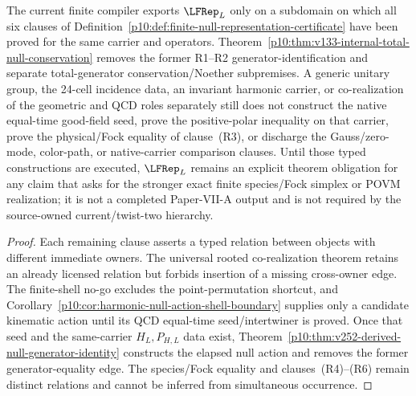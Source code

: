 \documentclass[12pt,a4paper]{article}
\begin{document}
\begin{theorem}
\label{p10:thm:finite-null-representation-status}
The current finite compiler exports \(\LFRep_L\) only on a subdomain on which
all six clauses of
Definition~\ref{p10:def:finite-null-representation-certificate} have been
proved for the same carrier and operators.  Theorem~\ref{p10:thm:v133-internal-total-null-conservation}
removes the former R1--R2 generator-identification and separate
total-generator conservation/Noether subpremises.  A generic unitary group,
the 24-cell incidence data, an invariant harmonic carrier, or co-realization
of the geometric and QCD roles separately still does not construct the native
equal-time good-field seed, prove the positive-polar inequality on that
carrier, prove the physical/Fock equality of clause~\textnormal{(R3)}, or
discharge the Gauss/zero-mode, color-path, or native-carrier comparison
clauses.  Until those typed constructions are executed,
\(\LFRep_L\) remains an explicit theorem obligation for any claim that asks
for the stronger exact finite species/Fock simplex or POVM realization; it is
not a completed Paper-VII-A output and is not required by the source-owned
current/twist-two hierarchy.
\end{theorem}

\begin{proof}
Each remaining clause asserts a typed relation between objects with different
immediate owners.  The universal rooted co-realization theorem retains an
already licensed relation but forbids insertion of a missing cross-owner edge.
The finite-shell no-go excludes the point-permutation shortcut, and
Corollary~\ref{p10:cor:harmonic-null-action-shell-boundary} supplies only a
candidate kinematic action until its QCD equal-time seed/intertwiner is proved.
Once that seed and the same-carrier \(H_L,P_{H,L}\) data exist,
Theorem~\ref{p10:thm:v252-derived-null-generator-identity} constructs the
elapsed null action and removes the former generator-equality edge.  The
species/Fock equality and clauses~\textnormal{(R4)--(R6)} remain distinct
relations and cannot be inferred from simultaneous occurrence.
\end{proof}
\end{document}
